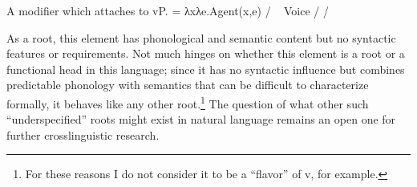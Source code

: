 \begin{exe}
\begin{xlist}
\begin{exe}
\begin{xlist}
\begin{exe}
\begin{xlist}
\begin{exe}
\begin{exe}
\begin{xlist}
\begin{exe}
\begin{xlist}
\begin{exe}
\begin{xlist}
\begin{exe}
\begin{xlist}
\begin{exe}
\begin{xlist}
\begin{exe}
\begin{xlist}
\begin{exe}
\begin{xlist}
\begin{exe}
\begin{xlist}
\begin{exe}
\begin{xlist}
\begin{exe}
\begin{xlist}
\begin{exe}
\begin{xlist}
\begin{exe}
\begin{xlist}
\begin{exe}
\begin{exe}
\begin{xlist}
\begin{exe}
\begin{xlist}
\begin{exe}
\begin{xlist}
\begin{exe}
\begin{xlist}
{\begin{exe}
\begin{xlist}
\begin{exe}
\begin{xlist}
\begin{exe}
\begin{xlist}
\begin{exe}
\begin{xlist}
\begin{xlist}
\begin{xlist}
\begin{exe}
\begin{xlist}
\begin{xlist}
\begin{xlist}
\begin{exe}
\begin{exe}
\begin{xlist}
\begin{exe}
\begin{xlist}
\begin{exe}
\begin{xlist}
\begin{exe}
\begin{xlist}
\begin{exe}
\begin{xlist}
\begin{exe}
\begin{xlist}
\begin{exe}
\begin{exe}
\begin{xlist}
\begin{xlist}
\begin{exe}
\begin{xlist}
\begin{exe}
\begin{xlist}
\begin{exe}
\begin{xlist}
\begin{exe}
\begin{xlist}
\begin{exe}
 \begin{xlist} 
 	\ex   A modifier which attaches to vP. 
 	\ex   {} = λxλe.Agent(x,e) / \trace~\va 
 	\ex   Voice {\lra} {\tpie} / {\trace} {\va} 
 	\ex   {\vz} {\lra} {\thit} / {\trace} {\va} 
 \z
\z 

As a root, this element has phonological and semantic content but no syntactic features or requirements. Not much hinges on whether this element is a root or a functional head in this language; since it has no syntactic influence but combines predictable phonology with semantics that can be difficult to characterize formally, it behaves like any other root.\footnote{For these reasons I do not consider it to be a ``flavor'' of v, for example.} The question of what other such ``underspecified'' roots might exist in natural language remains an open one for further crosslinguistic research.


\end{xlist}
\end{exe}
\end{xlist}
\end{exe}
\end{xlist}
\end{exe}
\end{xlist}
\end{exe}
\end{xlist}
\end{exe}
\end{xlist}
\end{xlist}
\end{exe}
\end{exe}
\end{xlist}
\end{exe}
\end{xlist}
\end{exe}
\end{xlist}
\end{exe}
\end{xlist}
\end{exe}
\end{xlist}
\end{exe}
\end{xlist}
\end{exe}
\end{exe}
\end{xlist}
\end{xlist}
\end{xlist}
\end{exe}
\end{xlist}
\end{xlist}
\end{xlist}
\end{exe}
\end{xlist}
\end{exe}
\end{xlist}
\end{exe}
\end{xlist}
\end{exe}}
\end{xlist}
\end{exe}
\end{xlist}
\end{exe}
\end{xlist}
\end{exe}
\end{xlist}
\end{exe}
\end{exe}
\end{xlist}
\end{exe}
\end{xlist}
\end{exe}
\end{xlist}
\end{exe}
\end{xlist}
\end{exe}
\end{xlist}
\end{exe}
\end{xlist}
\end{exe}
\end{xlist}
\end{exe}
\end{xlist}
\end{exe}
\end{xlist}
\end{exe}
\end{xlist}
\end{exe}
\end{xlist}
\end{exe}
\end{xlist}
\end{exe}
\end{exe}
\end{xlist}
\end{exe}
\end{xlist}
\end{exe}
\end{xlist}
\end{exe}
